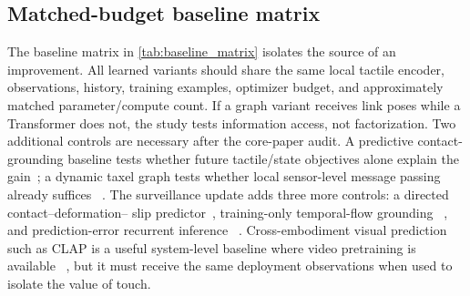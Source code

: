 \subsection{Matched-budget baseline matrix}

The baseline matrix in \cref{tab:baseline_matrix} isolates the source of an
improvement. All learned variants should share the same local tactile encoder,
observations, history, training examples, optimizer budget, and approximately
matched parameter/compute count. If a graph variant receives link poses while a
Transformer does not, the study tests information access, not factorization.
Two additional controls are necessary after the core-paper audit. A predictive
contact-grounding baseline tests whether future tactile/state objectives alone
explain the gain~\cite{heng2025vitacformer,xu2026contactgrounded}; a dynamic taxel
graph tests whether local sensor-level message passing already suffices
~\cite{ning2026touchwgnn}.
The surveillance update adds three more controls: a directed contact--deformation--
slip predictor~\cite{xue2026hitacwam}, training-only temporal-flow grounding
~\cite{yang2026temporalflowvla}, and prediction-error recurrent inference
~\cite{sawada2026predvla}. Cross-embodiment visual prediction such as CLAP is a
useful system-level baseline where video pretraining is available
~\cite{liu2026clap}, but it must receive the same deployment observations when
used to isolate the value of touch.

